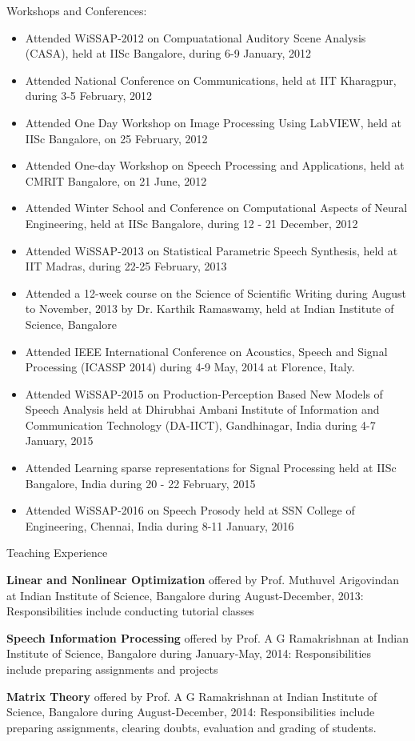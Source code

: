 \documentclass[10pt]{article}
\begin{document}
\begin{cv}
\begin{cvlist}{Workshops and Conferences:}
\begin{itemize}
\item Attended WiSSAP-2012 on Compuatational Auditory Scene Analysis (CASA), held at IISc Bangalore, during 6-9 January, 2012
\item Attended  National Conference on Communications,  held at IIT Kharagpur, during 3-5 February, 2012
\item Attended  One Day Workshop on Image Processing Using LabVIEW,  held at IISc Bangalore, on 25 February, 2012
\item Attended One-day Workshop on Speech Processing and Applications, held at CMRIT Bangalore, on 21 June, 2012
\item Attended Winter School and Conference on Computational Aspects of Neural Engineering, held at IISc Bangalore, during  12 - 21 December, 2012
\item Attended WiSSAP-2013 on Statistical Parametric Speech Synthesis, held at IIT Madras, during 22-25 February, 2013

\item Attended a 12-week course on the Science of Scientific Writing during August  to November, 2013 by Dr. Karthik Ramaswamy, held at Indian Institute of Science, Bangalore

\item Attended IEEE International Conference on Acoustics, Speech and Signal Processing (ICASSP 2014) during  4-9 May, 2014 at Florence, Italy.
\item Attended WiSSAP-2015 on Production-Perception Based New Models of Speech Analysis held at Dhirubhai Ambani 
Institute of Information and Communication Technology (DA-IICT), Gandhinagar, India  during 4-7 January, 2015 
\item Attended Learning  sparse representations for Signal Processing held at IISc Bangalore, India during  20 - 22 February, 2015
\item Attended WiSSAP-2016 on Speech Prosody held at SSN College of Engineering, Chennai, India during 8-11 January, 2016

	\end{itemize}
\end{cvlist}




\begin{cvlist}{Teaching Experience}

\item 
 \textbf{Linear and Nonlinear Optimization} offered  by Prof. Muthuvel Arigovindan at  Indian Institute of Science, Bangalore during 
 August-December, 2013: Responsibilities include conducting tutorial classes  
\item
 \textbf{Speech Information Processing}  offered  by Prof. A G Ramakrishnan at  Indian Institute of Science, Bangalore during 
  January-May, 2014: Responsibilities include   preparing assignments and projects
  \item
   \textbf{Matrix Theory}  offered  by Prof. A G Ramakrishnan at  Indian Institute of Science, Bangalore during 
    August-December, 2014: Responsibilities include   preparing assignments, clearing doubts, evaluation and grading of students.
      


\end{cvlist}
\end{cv}
\end{document}
